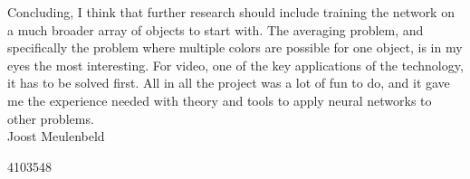 \documentclass[a4paper]{article}
\begin{document}
Concluding, I think that further research should include training the network on a much broader array of objects to start with. The averaging problem, and specifically the problem where multiple colors are possible for one object, is in my eyes the most interesting. For video, one of the key applications of the technology, it has to be solved first.
All in all the project was a lot of fun to do, and it gave me the experience needed with theory and tools to apply neural networks to other problems.\\

Joost Meulenbeld

4103548
\end{document}
